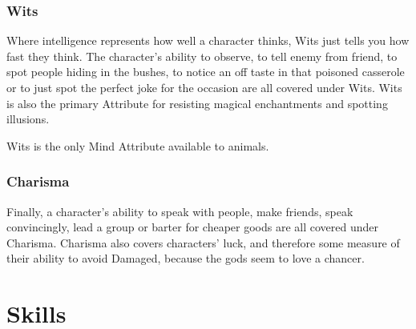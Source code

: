 \begin{multicols}{2}
\subsubsection[Wits]{Wits }

Where intelligence represents how well a character thinks, Wits just tells you how fast they think.
The character's ability to observe, to tell enemy from friend, to spot people hiding in the bushes, to notice an off taste in that poisoned casserole or to just spot the perfect joke for the occasion are all covered under Wits.
Wits is also the primary Attribute for resisting magical enchantments and spotting illusions.

Wits is the only Mind Attribute available to animals.

\subsubsection[Charisma]{Charisma }

Finally, a character's ability to speak with people, make friends, speak convincingly, lead a group or barter for cheaper goods are all covered under Charisma.
Charisma also covers characters' luck, and therefore some measure of their ability to avoid Damaged, because the gods seem to love a chancer.

\end{multicols}

\section{Skills}

\label{skills}

